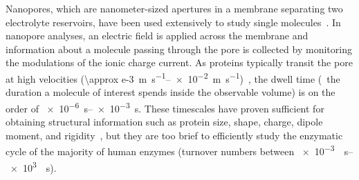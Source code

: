 Nanopores, which are nanometer-sized apertures in a membrane separating two electrolyte reservoirs, have been
used extensively to study single
molecules~\cite{Ma-2009,Laszlo-2016,Willems-VanMeervelt-2017,Varongchayakul-2018}. In nanopore analyses, an
electric field is applied across the membrane and information about a molecule passing through the pore is
collected by monitoring the modulations of the ionic charge current. As proteins typically transit the pore at
high velocities (\SIrange{\approx e-3}{e-2}{\meter\per\second})~\cite{Fologea-2007,Plesa-2013,Li-2013B,
Larkin-2014}, the dwell time (\ie~the duration a molecule of interest spends inside the observable volume) is
on the order of \SIrange{e-6}{e-3}{\second}. These timescales have proven sufficient for obtaining structural
information such as protein size, shape, charge, dipole moment, and
rigidity~\cite{Fologea-2007,Larkin-2014,Waduge-2017,Hu-2018,Houghtaling-2019}, but they are too brief to
efficiently study the enzymatic cycle of the majority of human enzymes (turnover numbers between
\SIrange{e-3}{e3}{\per\second}).


